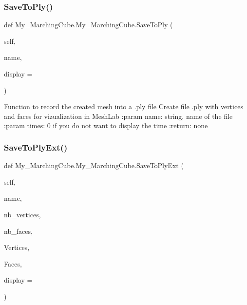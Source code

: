 \subsubsection{\texorpdfstring{Save\+To\+Ply()}{SaveToPly()}}
{\footnotesize\ttfamily def My\+\_\+\+Marching\+Cube.\+My\+\_\+\+Marching\+Cube.\+Save\+To\+Ply (\begin{DoxyParamCaption}\item[{}]{self,  }\item[{}]{name,  }\item[{}]{display = {} }\end{DoxyParamCaption})}

\begin{DoxyVerb}Function to record the created mesh into a .ply file
Create file .ply with vertices and faces for vizualization in MeshLab
:param name: string, name of the file
:param times: 0 if you do not want to display the time
:return: none
\end{DoxyVerb}
 \mbox{\label{class_my___marching_cube_1_1_my___marching_cube_a9c250e7239f5e6a7f547ee18f0ad6e43}} 
\subsubsection{\texorpdfstring{Save\+To\+Ply\+Ext()}{SaveToPlyExt()}}
{\footnotesize\ttfamily def My\+\_\+\+Marching\+Cube.\+My\+\_\+\+Marching\+Cube.\+Save\+To\+Ply\+Ext (\begin{DoxyParamCaption}\item[{}]{self,  }\item[{}]{name,  }\item[{}]{nb\+\_\+vertices,  }\item[{}]{nb\+\_\+faces,  }\item[{}]{Vertices,  }\item[{}]{Faces,  }\item[{}]{display = {} }\end{DoxyParamCaption})}

